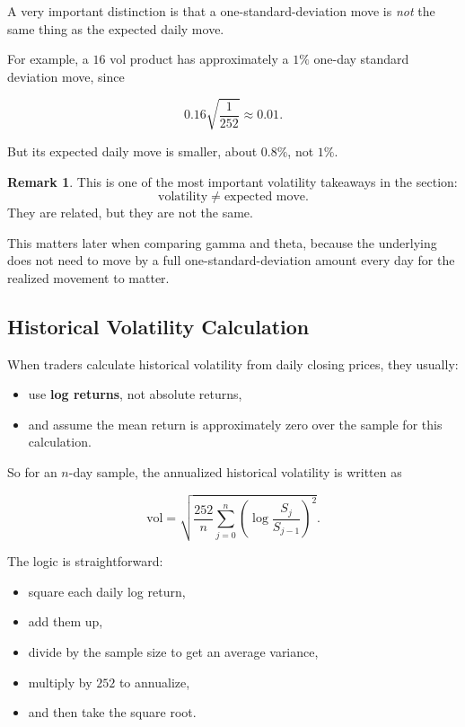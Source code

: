\documentclass[11pt]{article}
\theoremstyle{definition}
\newtheorem{remark}{Remark}[section]
\begin{document}
A very important distinction is that a one-standard-deviation move is \emph{not} the same thing as the expected daily move.

For example, a \(16\) vol product has approximately a \(1\%\) one-day standard deviation move, since

\[
0.16 \sqrt{\frac{1}{252}} \approx 0.01.
\]

But its expected daily move is smaller, about \(0.8\%\), not \(1\%\).

\begin{remark}
This is one of the most important volatility takeaways in the section:
\[
\text{volatility} \neq \text{expected move}.
\]
They are related, but they are not the same.
\end{remark}

This matters later when comparing gamma and theta, because the underlying does not need to move by a full one-standard-deviation amount every day for the realized movement to matter.

\subsection{Historical Volatility Calculation}

When traders calculate historical volatility from daily closing prices, they usually:

\begin{itemize}
    \item use \textbf{log returns}, not absolute returns,
    \item and assume the mean return is approximately zero over the sample for this calculation.
\end{itemize}

So for an \(n\)-day sample, the annualized historical volatility is written as

\[
\text{vol} = \sqrt{\frac{252}{n}\sum_{j=0}^{n}\left(\log\frac{S_j}{S_{j-1}}\right)^2 }.
\]

The logic is straightforward:
\begin{itemize}
    \item square each daily log return,
    \item add them up,
    \item divide by the sample size to get an average variance,
    \item multiply by \(252\) to annualize,
    \item and then take the square root.
\end{itemize}
\end{document}
